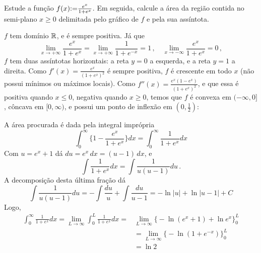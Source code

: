 \begin{exo}
Estude a função $f(x){:=} \frac{e^x}{1+e^x}$.
Em seguida, calcule a área da região contida no semi-plano $x\geq 0$ delimitada
pelo gráfico de $f$ e pela sua assíntota.
\begin{sol}
$f$ tem domínio $\mathbb{R}$, e é sempre positiva. Já que 
$$
\lim_{x\to +\infty} \frac{e^x}{1+e^x}=\lim_{x\to+\infty}
\frac{1}{1+e^{-x}}=1\,,\quad 
\lim_{x\to-\infty} \frac{e^x}{1+e^x}=0\,,
$$
$f$ tem duas assíntotas horizontais: a reta $y=0$ a esquerda, e a reta $y=1$ a
direita.
Como $f'(x)=\frac{e^x}{(1+e^x)^2}$ é sempre positiva, $f$ é crescente em todo
$x$ (não possui mínimos ou máximos locais). Como
$f''(x)=\frac{e^x(1-e^x)}{(1+e^x)^2}$,
e que essa é positiva quando $x\leq 0$, negativa quando $x\geq 0$, temos que $f$
é convexa em $(-\infty,0]$, côncava em $[0,\infty)$, e possui um ponto de
inflexão em $(0,\tfrac12)$: 
\begin{center}
\begin{bmlimage}\end{bmlimage}
\end{center}

A área procurada é dada pela integral imprópria
$$\int_0^\infty\Big\{1-\frac{e^x}{1+e^x}\Big\}dx=\int_0^\infty\frac{1}{1+e^x}
dx$$
Com $u=e^x+1$ dá $du=e^x\,dx=(u-1)\,dx$, e
$$
\int \frac{1}{1+e^x}dx=\int\frac{1}{u(u-1)}du\,.
$$
A decomposição desta última fração dá
$$
\int\frac{1}{u(u-1)}du=-\int\frac{du}{u}+\int \frac{du}{u-1}=-\ln|u|+\ln|u-1|+C
$$
Logo,
\begin{align*}
\int_0^\infty\frac{1}{1+e^x}dx=\lim_{L\to\infty}\int_0^L\frac{1}{1+e^x}dx=
&\lim_{L\to\infty}\Big\{
-\ln (e^x+1)+\ln e^x
\Big\}_0^L\\
&=\lim_{L\to\infty}\Big\{
-\ln (1+e^{-x})
\Big\}_0^L\\
&=\ln 2
\end{align*}
\end{sol}
\end{exo}

